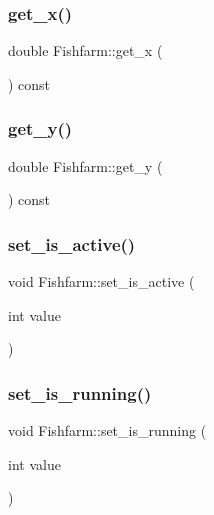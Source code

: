 \subsubsection{\texorpdfstring{get\_x()}{get\_x()}}
{\footnotesize\ttfamily double Fishfarm\+::get\+\_\+x (\begin{DoxyParamCaption}{ }\end{DoxyParamCaption}) const}

\mbox{\label{class_fishfarm_ab79f2b7498216698ef9e017118ab01b7}} 
\subsubsection{\texorpdfstring{get\_y()}{get\_y()}}
{\footnotesize\ttfamily double Fishfarm\+::get\+\_\+y (\begin{DoxyParamCaption}{ }\end{DoxyParamCaption}) const}

\mbox{\label{class_fishfarm_ac7b440c993ed7d0bcf4e6853129f722d}} 
\subsubsection{\texorpdfstring{set\_is\_active()}{set\_is\_active()}}
{\footnotesize\ttfamily void Fishfarm\+::set\+\_\+is\+\_\+active (\begin{DoxyParamCaption}\item[{int}]{value }\end{DoxyParamCaption})}

\mbox{\label{class_fishfarm_aaebc35e12a8370ef3bc03e4bcff9cbfc}} 
\subsubsection{\texorpdfstring{set\_is\_running()}{set\_is\_running()}}
{\footnotesize\ttfamily void Fishfarm\+::set\+\_\+is\+\_\+running (\begin{DoxyParamCaption}\item[{int}]{value }\end{DoxyParamCaption})}

